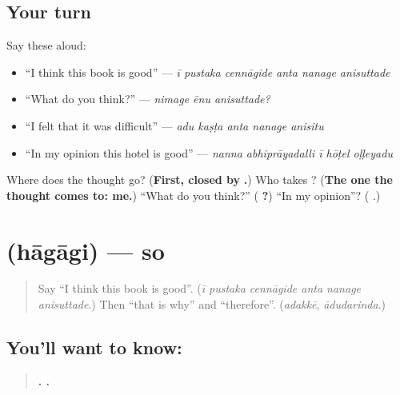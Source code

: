 \subsection*{Your turn}
Say these aloud:

\begin{itemize}
\raggedright
  \item \textquotedblleft{}I think this book is good\textquotedblright{} — \emph{ī pustaka cennāgide anta nanage anisuttade}
  \item \textquotedblleft{}What do you think?\textquotedblright{} — \emph{nimage ēnu anisuttade?}
  \item \textquotedblleft{}I felt that it was difficult\textquotedblright{} — \emph{adu kaṣṭa anta nanage anisitu}
  \item \textquotedblleft{}In my opinion this hotel is good\textquotedblright{} — \emph{nanna abhiprāyadalli ī hōṭel oḷḷeyadu}
\end{itemize}

\begin{tcolorbox}[breakable,colback=teal!4,colframe=teal!35!black,title={Before you move on}]
Where does the thought go? (\textbf{First, closed by }\textbf{.}) Who takes \textbf{}? (\textbf{The one the thought comes to: me.}) \textquotedblleft{}What do you think?\textquotedblright{} (\textbf{  ?}) \textquotedblleft{}In my opinion\textquotedblright{}? (\textbf{ }.)
\end{tcolorbox}
\section[\texorpdfstring{\kn{ಹಾಗಾಗಿ} (hāgāgi)}{ಹಾಗಾಗಿ (hāgāgi)}]{ (hāgāgi) — so}

\label{lesson:KA-C311-hagagi}



\begin{quote}
Say \textquotedblleft{}I think this book is good\textquotedblright{}. (\emph{ī pustaka cennāgide anta nanage anisuttade}.) Then \textquotedblleft{}that is why\textquotedblright{} and \textquotedblleft{}therefore\textquotedblright{}. (\emph{adakkē}, \emph{ādudarinda}.)
\end{quote}

\subsection*{You'll want to know: }
\begin{quote}
\textbf{  .    .}
\end{quote}

